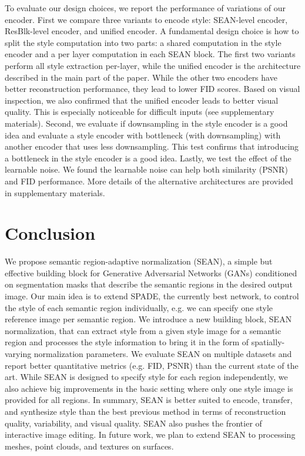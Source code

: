 \documentclass[10pt,twocolumn,letterpaper]{article}
\begin{document}
To evaluate our design choices, we report the performance of variations of our encoder. First we compare three variants to encode style: SEAN-level encoder, ResBlk-level encoder, and unified encoder.
A fundamental design choice is how to split the style computation into two parts: a shared computation in the style encoder and a per layer computation in each SEAN block.
The first two variants perform all style extraction per-layer, while the unified encoder is the architecture described in the main part of the paper.
While the other two encoders have better reconstruction performance, they lead to lower FID scores. 
Based on visual inspection, we also confirmed that the unified encoder leads to better visual quality. This is especially noticeable for difficult inputs (see supplementary materials).
Second, we evaluate if downsampling in the style encoder is a good idea and evaluate a style encoder with bottleneck (with downsampling) with another encoder that uses less downsampling. This test confirms that introducing a bottleneck in the style encoder is a good idea. Lastly, we test the effect of the learnable noise. We found the learnable noise can help both similarity (PSNR) and FID performance. More details of the alternative architectures are provided in supplementary materials. 




\section{Conclusion}

We propose semantic region-adaptive normalization (SEAN), a simple but effective building block for Generative Adversarial Networks (GANs) conditioned on segmentation masks that describe the semantic regions in the desired output image.
Our main idea is to extend SPADE, the currently best network, to control the style of each semantic region individually, e.g. we can specify one style reference image per semantic region. We introduce a new building block, SEAN normalization, that can extract style from a given style image for a semantic region and processes the style information to bring it in the form of spatially-varying normalization parameters.
We evaluate SEAN on multiple datasets and report better quantitative metrics (e.g. FID, PSNR) than the current state of the art.
While SEAN is designed to specify style for each region independently, we also achieve big improvements in the basic setting where only one style image is provided for all regions.
In summary, SEAN is better suited to encode, transfer, and synthesize style than the best previous method in terms of reconstruction quality, variability, and visual quality. SEAN also pushes the frontier of interactive image editing. In future work, we plan to extend SEAN to processing meshes, point clouds, and textures on surfaces.
\end{document}
